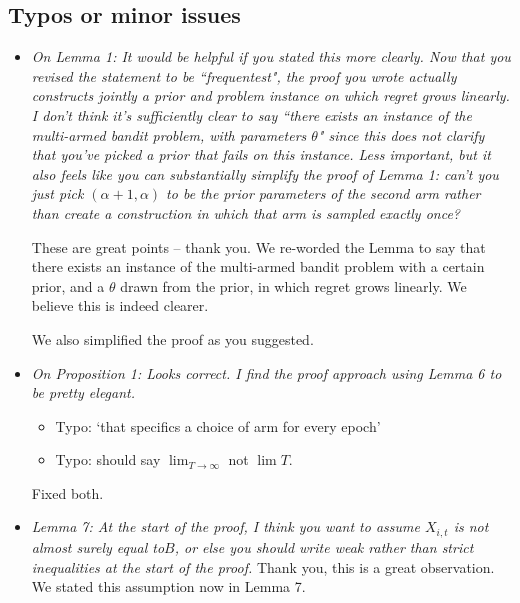 \documentclass[11pt]{article}
\newcommand{\1}{\ensuremath{\mathbf{1}}} %
\theoremstyle{thm-sf}
\begin{document}
	\subsection{Typos or minor issues}
	
	\begin{itemize}
		\item {\it On Lemma 1: It would be helpful if you stated this more clearly. Now that you revised the statement to be ``frequentest", the proof you wrote actually constructs jointly a prior and problem instance on which regret grows linearly. I don't think it's sufficiently clear to say ``there exists an instance of the multi-armed bandit problem, with parameters $\theta$" since this does not clarify that you’ve picked a prior that fails on this instance. Less important, but it also feels like you can substantially simplify the proof of Lemma 1: can’t you just pick $(\alpha + 1, \alpha)$ to be the prior parameters of the second arm rather than create a construction in which that arm is sampled exactly once?
		}
		
		These are great points -- thank you. We re-worded the Lemma to say that there exists an instance of the multi-armed bandit problem with a certain prior, and a $\theta$ drawn from the prior, in which regret grows linearly. We believe this is indeed clearer.
		
		We also simplified the proof as you suggested.
		
		\item {\it On Proposition 1: Looks correct. I find the proof approach using Lemma 6 to be pretty elegant.
			\begin{itemize}
				\item Typo: `that specifics a choice of arm for every epoch'
				\item  Typo: should say $\lim_{T\to\infty}$ not $\lim T$.
			\end{itemize}
		}
	
		Fixed both.
	
		\item {\it Lemma 7: At the start of the proof, I think you want to assume $X_{i,t}$ is not almost surely equal to$ B$, or else you should write weak rather than strict inequalities at the start of the proof.}
		Thank you, this is a great observation. We stated this assumption now in Lemma 7.
	
	
	


	
	\end{itemize}

	





 
\end{document}
